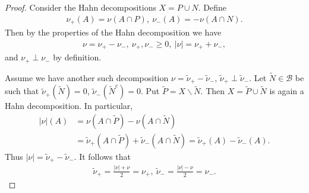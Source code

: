 \ifdetailed
\begin{proof}
    Consider the Hahn decompositions \(X = P \cup N\). Define
    \begin{align*}
        \nu_+(A) = \nu(A\cap P), \ \nu_-(A) = -\nu(A\cap N).
    \end{align*}
    Then by the properties of the Hahn decomposition we have
    \begin{align*}
        \nu = \nu_+ - \nu_-, \ \nu_+,\nu_-\geq 0, \ |\nu| = \nu_+ + \nu_-,
    \end{align*}
    and \(\nu_+ \perp \nu_-\) by definition. 

    Assume we have another such decomposition \(\nu=\tilde{\nu}_+ - \tilde{\nu}_-\), \(\tilde{\nu}_+\perp \tilde{\nu}_-\). Let \(\tilde{N}\in\mathscr{B}\) be such that \(\tilde{\nu}_+(\tilde{N})=0\), \(\tilde{\nu}_-(\tilde{N}^c)=0\). Put \(\tilde{P}=X\backslash \tilde{N}\). Then \(X = \tilde{P}\cup \tilde{N}\) is again a Hahn decomposition. In particular, 
    \begin{align*}
        |\nu|(A) &= \nu(A\cap \tilde{P})-\nu(A\cap\tilde{N}) \\
        &=\tilde{\nu}_+(A\cap\tilde{P}) + \tilde{\nu}_-(A\cap\tilde{N}) = \tilde{\nu}_+(A) - \tilde{\nu}_-(A).
    \end{align*}
    Thus \(|\nu|=\tilde{\nu}_+ - \tilde{\nu}_-\). It follows that 
    \begin{align*}
        \tilde{\nu}_+ = \frac{|\nu|+\nu}{2} = \nu_+, \ \tilde{\nu}_- = \frac{|\nu| - \nu}{2} = \nu_-.
    \end{align*}
\end{proof}
\fi 